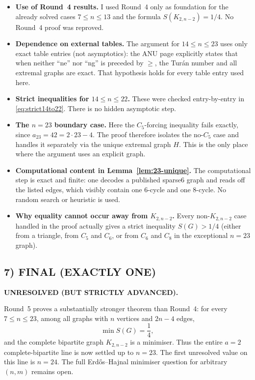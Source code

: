 \begin{itemize}
\item \textbf{Use of Round~4 results.}
I used Round~4 only as foundation for the already solved cases $7\le n\le 13$ and the formula $S(K_{2,n-2})=1/4$.
No Round~4 proof was reproved.

\item \textbf{Dependence on external tables.}
The argument for $14\le n\le 23$ uses only exact table entries (not asymptotics): the ANU page explicitly states that when neither ``ne'' nor ``ng'' is preceded by $\ge$, the Tur\'an number and all extremal graphs are exact.
That hypothesis holds for every table entry used here.

\item \textbf{Strict inequalities for $14\le n\le 22$.}
These were checked entry-by-entry in \eqref{eq:strict14to22}. There is no hidden asymptotic step.

\item \textbf{The $n=23$ boundary case.}
Here the $C_5$-forcing inequality fails exactly, since $a_{23}=42=2\cdot 23-4$.
The proof therefore isolates the no-$C_5$ case and handles it separately via the unique extremal graph $H$.
This is the only place where the argument uses an explicit graph.

\item \textbf{Computational content in Lemma~\ref{lem:23-unique}.}
The computational step is exact and finite: one decodes a published sparse6 graph and reads off the listed edges, which visibly contain one $6$-cycle and one $8$-cycle.
No random search or heuristic is used.

\item \textbf{Why equality cannot occur away from $K_{2,n-2}$.}
Every non-$K_{2,n-2}$ case handled in the proof actually gives a strict inequality $S(G)>1/4$ (either from a triangle, from $C_5$ and $C_6$, or from $C_6$ and $C_8$ in the exceptional $n=23$ graph).
\end{itemize}

\subsection*{7) FINAL (EXACTLY ONE)}

\textbf{UNRESOLVED (BUT STRICTLY ADVANCED).}

Round~5 proves a substantially stronger theorem than Round~4:
for every $7\le n\le 23$, among all graphs with $n$ vertices and $2n-4$ edges,
\[
\min S(G)=\frac14,
\]
and the complete bipartite graph $K_{2,n-2}$ is a minimiser.
Thus the entire $a=2$ complete-bipartite line is now settled up to $n=23$.
The first unresolved value on this line is $n=24$.
The full Erd\H{o}s--Hajnal minimiser question for arbitrary $(n,m)$ remains open.

